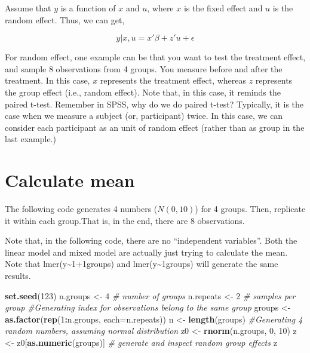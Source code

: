 \documentclass[]{book}
\newenvironment{Shaded}{\begin{snugshade}}{\end{snugshade}}
\newcommand{\KeywordTok}[1]{\textcolor[rgb]{0.13,0.29,0.53}{\textbf{#1}}}
\newcommand{\DataTypeTok}[1]{\textcolor[rgb]{0.13,0.29,0.53}{#1}}
\newcommand{\DecValTok}[1]{\textcolor[rgb]{0.00,0.00,0.81}{#1}}
\newcommand{\StringTok}[1]{\textcolor[rgb]{0.31,0.60,0.02}{#1}}
\newcommand{\CommentTok}[1]{\textcolor[rgb]{0.56,0.35,0.01}{\textit{#1}}}
\newcommand{\OperatorTok}[1]{\textcolor[rgb]{0.81,0.36,0.00}{\textbf{#1}}}
\newcommand{\NormalTok}[1]{#1}
\begin{document}
Assume that \(y\) is a function of \(x\) and \(u\), where \(x\) is the
fixed effect and \(u\) is the random effect. Thus, we can get,

\[y|x, u = x'\beta+z'u+\epsilon\]

For random effect, one example can be that you want to test the
treatment effect, and sample 8 observations from 4 groups. You measure
before and after the treatment. In this case, \(x\) represents the
treatment effect, whereas \(z\) represents the group effect (i.e.,
random effect). Note that, in this case, it reminds the paired t-test.
Remember in SPSS, why do we do paired t-test? Typically, it is the case
when we measure a subject (or, participant) twice. In this case, we can
consider each participant as an unit of random effect (rather than as
group in the last example.)

\section{Calculate mean}\label{calculate-mean}

The following code generates 4 numbers (\(N(0,10)\)) for 4 groups. Then,
replicate it within each group.That is, in the end, there are 8
observations.

Note that, in the following code, there are no ``independent
variables''. Both the linear model and mixed model are actually just
trying to calculate the mean. Note that
lmer(y\textasciitilde{}1+1\textbar{}groups) and
lmer(y\textasciitilde{}1\textbar{}groups) will generate the same
results.

\begin{Shaded}
\begin{Highlighting}[]
\KeywordTok{set.seed}\NormalTok{(}\DecValTok{123}\NormalTok{)}
\NormalTok{n.groups <-}\StringTok{ }\DecValTok{4} \CommentTok{# number of groups}
\NormalTok{n.repeats <-}\StringTok{ }\DecValTok{2} \CommentTok{# samples per group}
\CommentTok{#Generating index for observations belong to the same group}
\NormalTok{groups <-}\StringTok{ }\KeywordTok{as.factor}\NormalTok{(}\KeywordTok{rep}\NormalTok{(}\DecValTok{1}\OperatorTok{:}\NormalTok{n.groups, }\DataTypeTok{each=}\NormalTok{n.repeats))}
\NormalTok{n <-}\StringTok{ }\KeywordTok{length}\NormalTok{(groups)}
\CommentTok{#Generating 4 random numbers, assuming normal distribution}
\NormalTok{z0 <-}\StringTok{ }\KeywordTok{rnorm}\NormalTok{(n.groups, }\DecValTok{0}\NormalTok{, }\DecValTok{10}\NormalTok{) }
\NormalTok{z <-}\StringTok{ }\NormalTok{z0[}\KeywordTok{as.numeric}\NormalTok{(groups)] }\CommentTok{# generate and inspect random group effects}
\NormalTok{z}
\end{Highlighting}
\end{Shaded}
\end{document}
